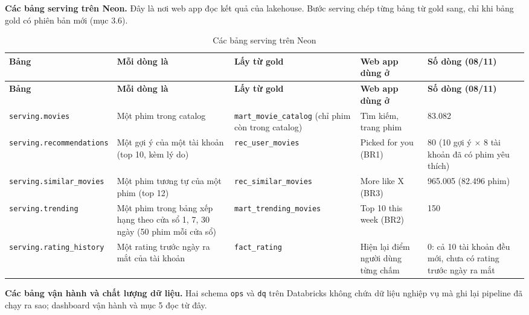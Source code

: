 \documentclass[a4paper,11pt]{article}
\newlength{\reporttablewidth}
\newcommand{\dbsep}{\_\allowbreak}
\begin{document}
\textbf{Các bảng serving trên Neon.} Đây là nơi web app đọc kết quả của lakehouse. Bước serving chép từng bảng từ gold sang, chỉ khi bảng gold có phiên bản mới (mục 3.6).

\begingroup
\footnotesize
{}
\setlength{\tabcolsep}{4pt}
\renewcommand{\arraystretch}{1.18}
\setlength{\reporttablewidth}{\dimexpr\linewidth-8\tabcolsep\relax}
\begin{longtable}{@{}L{0.24\reporttablewidth} L{0.16\reporttablewidth} L{0.27\reporttablewidth} L{0.17\reporttablewidth} L{0.16\reporttablewidth}@{}}
\caption[Các bảng serving trên Neon (Phụ lục E)]{Các bảng serving trên Neon}\label{tab:29} \\
\toprule
\textbf{Bảng} & \textbf{Mỗi dòng là} & \textbf{Lấy từ gold} & \textbf{Web app dùng ở} & \textbf{Số dòng (08/11)} \\
\midrule
\endfirsthead
\toprule
\textbf{Bảng} & \textbf{Mỗi dòng là} & \textbf{Lấy từ gold} & \textbf{Web app dùng ở} & \textbf{Số dòng (08/11)} \\
\midrule
\endhead
\midrule
\endfoot
\bottomrule
\endlastfoot
\texttt{serving.\allowbreak{}movies} & Một phim trong catalog & \texttt{mart\dbsep{}movie\dbsep{}catalog} (chỉ phim còn trong catalog) & Tìm kiếm, trang phim & 83.082 \\
\texttt{serving.\allowbreak{}recommendations} & Một gợi ý của một tài khoản (top 10, kèm lý do) & \texttt{rec\dbsep{}user\dbsep{}movies} & \textquotedbl{}Picked for you\textquotedbl{} (BR1) & 80 (10 gợi ý \ensuremath{\times} 8 tài khoản đã có phim yêu thích) \\
\texttt{serving.\allowbreak{}similar\dbsep{}movies} & Một phim tương tự của một phim (top 12) & \texttt{rec\dbsep{}similar\dbsep{}movies} & \textquotedbl{}More like X\textquotedbl{} (BR3) & 965.005 (82.496 phim) \\
\texttt{serving.\allowbreak{}trending} & Một phim trong bảng xếp hạng theo cửa sổ 1, 7, 30 ngày (50 phim mỗi cửa sổ) & \texttt{mart\dbsep{}trending\dbsep{}movies} & \textquotedbl{}Top 10 this week\textquotedbl{} (BR2) & 150 \\
\texttt{serving.\allowbreak{}rating\dbsep{}history} & Một rating trước ngày ra mắt của tài khoản & \texttt{fact\dbsep{}rating} & Hiện lại điểm người dùng từng chấm & 0: cả 10 tài khoản đều mới, chưa có rating trước ngày ra mắt \\
\end{longtable}
\endgroup

\textbf{Các bảng vận hành và chất lượng dữ liệu.} Hai schema \texttt{ops} và \texttt{dq} trên Databricks không chứa dữ liệu nghiệp vụ mà ghi lại pipeline đã chạy ra sao; dashboard vận hành và mục 5 đọc từ đây.
\end{document}

